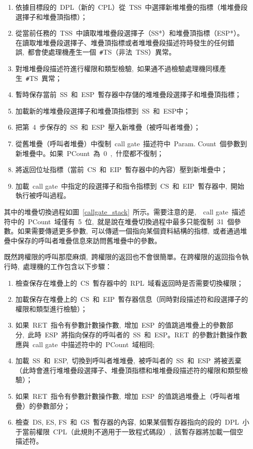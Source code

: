 \begin{enumerate}
\item 依據目標段的~DPL（新的~CPL）從~TSS~中選擇新堆堆疊的指標（堆堆疊段選擇子和堆疊頂指標）；
\item 從當前任務的~TSS~中讀取堆堆疊段選擇子（SS*）和堆疊頂指標（ESP*）。在讀取堆堆疊段選擇子、堆疊頂指標或者堆堆疊段描述符時發生的任何錯誤,~都會使處理機產生一個~\texttt{\#}TS（非法~TSS）異常。
\item 對堆堆疊段描述符進行權限和類型檢驗,~如果通不過檢驗處理機同樣產生~\texttt{\#}TS~異常；
\item 暫時保存當前~SS~和~ESP~暫存器中存儲的堆堆疊段選擇子和堆疊頂指標；
\item 加載新的堆堆疊段選擇子和堆疊頂指標到~SS~和~ESP中；
\item 把第~4~步保存的~SS~和~ESP~壓入新堆疊（被呼叫者堆疊）；
\item 從舊堆疊（呼叫者堆疊）中復制~call gate~描述符中~Param. Count~個參數到新堆疊中。如果~PCount~為~0~,~什麼都不復制；
\item 將返回位址指標（當前~CS~和~EIP~暫存器中的內容）壓到新堆疊中；
\item 加載~call gate~中指定的段選擇子和指令指標到~CS~和~EIP~暫存器中,~開始執行被呼叫過程。
\end{enumerate}


其中的堆疊切換過程如圖~\ref{callgate_stack}~所示。需要注意的是,~~call gate~描述符中的~PCount~域僅有~5~位,~就是說在堆疊切換過程中最多只能復制~31~個參數。如果需要傳遞更多參數,~可以傳遞一個指向某個資料結構的指標,~或者通過堆疊中保存的呼叫者堆疊信息來訪問舊堆疊中的參數。

既然跨權限的呼叫那麼麻煩,~跨權限的返回也不會很簡單。在跨權限的返回指令執行時,~處理機的工作包含以下步驟：

\begin{enumerate}
\item 檢查保存在堆疊上的~CS~暫存器中的~RPL~域看返回時是否需要切換權限；
\item 加載保存在堆疊上的~CS~和~EIP~暫存器信息（同時對段描述符和段選擇子的權限和類型進行檢驗）；
\item 如果~RET~指令有參數計數操作數,~增加~ESP~的值跳過堆疊上的參數部分,~此時~ESP~將指向保存的呼叫者的~SS~和~ESP。RET~的參數計數操作數應與~call gate~中描述符中的~PCount~域相同;
\item 加載~SS~和~ESP,~切換到呼叫者堆堆疊,~被呼叫者的~SS~和~ESP~將被丟棄（此時會進行堆堆疊段選擇子、堆疊頂指標和堆堆疊段描述符的權限和類型檢驗）；
\item 如果~RET~指令有參數計數操作數,~增加~ESP~的值跳過堆疊上（呼叫者堆疊）的參數部分；
\item 檢查~DS, ES, FS~和~GS~暫存器的內容,~如果某個暫存器指向的段的~DPL~小于當前權限~CPL（此規則不適用于一致程式碼段）,~該暫存器將加載一個空描述符。
\end{enumerate}

